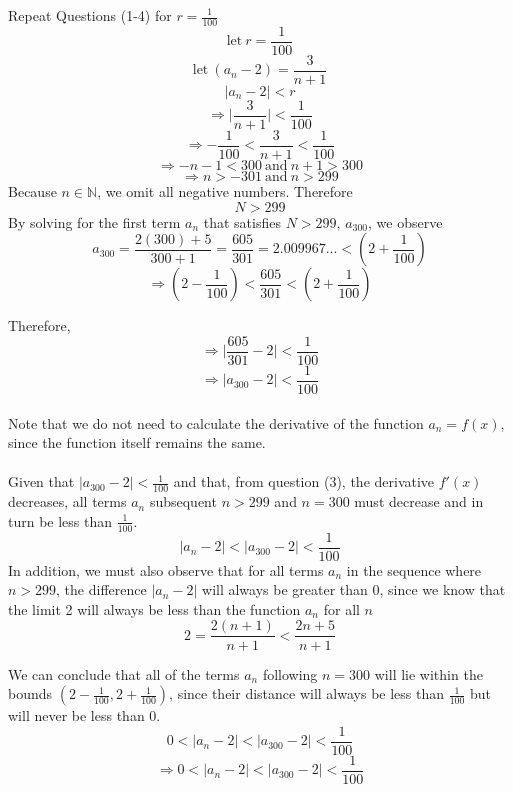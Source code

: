 \documentclass{article}
\newenvironment{problem}[2][Problem]{\begin{trivlist}
\item[\hskip \labelsep {\bfseries #1}\hskip \labelsep {\bfseries #2.}]}{\end{trivlist}}
\newcommand{\N}{\mathbb{N}}
\begin{document}
\begin{problem}{1.5.1}
  Repeat Questions (1-4) for $ r = \frac{1}{100} $
  \[ \textrm{let}~r =\frac{1}{100}  \]
  \[ \textrm{let}~(a_{n}-2) = \frac{3}{n+1}\]
  \[ |a_{n}-2| < r\]
  \[ \Rightarrow \Biggr| \frac{3}{n+1} \Biggr| < \frac{1}{100}\]
  \[ \Rightarrow -\frac{1}{100} < \frac{3}{n+1} < \frac{1}{100} \]
  \[ \Rightarrow -n - 1 < 300 ~\textrm{and}~ n+1 > 300 \]
  \[ \Rightarrow n > -301 ~\textrm{and}~ n > 299 \]
  Because $ n \in \N $, we omit all negative numbers. Therefore
  \[ N > 299 \]
   By solving for the first term $ a_{n}$ that satisfies
   $ N > 299 $, $ a_{300} $, we observe
  \[ a_{300} = \frac{2(300)+5}{300+1} = \frac{605}{301} = 2.009967... < (2+\frac{1}{100}) \]
  \[ \Rightarrow (2-\frac{1}{100}) < \frac{605}{301} < (2+\frac{1}{100}) \]

  Therefore,
  \[ \Rightarrow \Biggr|\frac{605}{301} - 2\Biggr| < \frac{1}{100} \]
  \[ \Rightarrow  |a_{300} - 2| < \frac{1}{100} \]
  \\
  Note that we do not need to calculate the derivative of the function $ a_{n} = f(x) $, since the function itself remains the same.
  \\
  \\
  Given that $ |a_{300} - 2| < \frac{1}{100} $ and that, from question (3),  the derivative  $ f'(x)$ decreases, all terms $a_{n}$ subsequent  $n > 299 $ and $ n = 300 $ must decrease and in turn be less than $ \frac{1}{100}$.
  \[ |a_{n} - 2| < |a_{300} - 2| < \frac{1}{100} \]
  In addition, we must also observe that for all terms $ a_{n} $ in the sequence  where $ n > 299 $,  the difference $ |a_{n}-2| $ will always
  be greater than 0, since we know that the limit 2 will always
  be less than the function $ a_{n} $ for all $ n$
  \[ 2 = \frac{2(n+1)}{n+1} < \frac{2n+5}{n+1}\]

  We can
  conclude that all of the terms $a_{n}$ following $ n = 300 $ will
  lie  within the bounds $(2-\frac{1}{100}, 2+\frac{1}{100})$, since their distance
  will always be less than $\frac{1}{100}$ but will never be less than 0.
  \[ 0 < |a_{n} - 2| < |a_{300} - 2| < \frac{1}{100}\]
  \[ \Rightarrow 0 < |a_{n} - 2| < |a_{300} - 2| < \frac{1}{100} \]
\end{problem}
\end{document}
